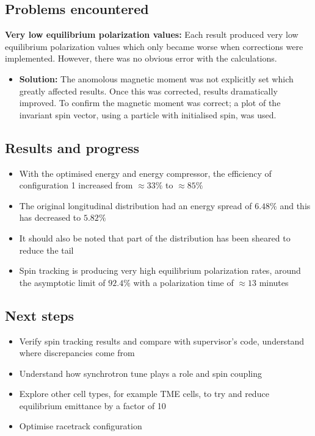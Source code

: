 \documentclass{article}
\begin{document}
\subsection{Problems encountered}

\textbf{Very low equilibrium polarization values:} Each result produced very low equilibrium polarization values which only became worse when corrections were implemented. However, there was no obvious error with the calculations.
\begin{itemize}
    \item \textbf{Solution:} The anomolous magnetic moment was not explicitly set which greatly affected results. Once this was corrected, results dramatically improved. To confirm the magnetic moment was correct; a plot of the invariant spin vector, using a particle with initialised spin, was used.
\end{itemize}

\subsection{Results and progress}
\begin{itemize}
    \item With the optimised energy and energy compressor, the efficiency of configuration 1 increased from $\approx 33\%$ to $\approx 85\%$
    \item The original longitudinal distribution had an energy spread of $6.48\%$ and this has decreased to $5.82\%$
    \item It should also be noted that part of the distribution has been sheared to reduce the tail
    \item Spin tracking is producing very high equilibrium polarization rates, around the asymptotic limit of $92.4\%$ with a polarization time of $\approx 13$ minutes
\end{itemize}

\subsection{Next steps}
\begin{itemize}
    \item Verify spin tracking results and compare with supervisor's code, understand where discrepancies come from
    \item Understand how synchrotron tune plays a role and spin coupling
    \item Explore other cell types, for example TME cells, to try and reduce equilibrium emittance by a factor of 10 
    \item Optimise racetrack configuration
\end{itemize}
\end{document}
